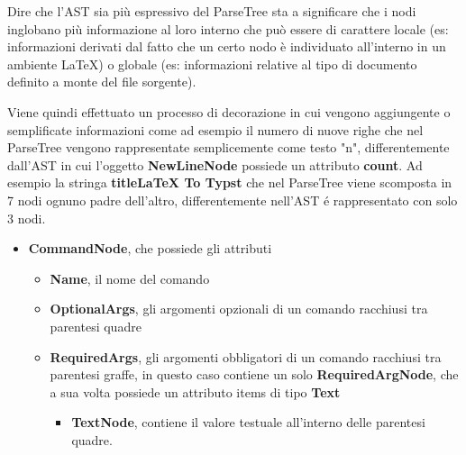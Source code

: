 \documentclass{article}
\begin{document}
    Dire che l'AST sia più espressivo del ParseTree sta a significare che i nodi inglobano più informazione al loro interno che può essere di carattere locale (es: informazioni derivati dal fatto che un certo nodo è individuato all'interno in un ambiente LaTeX) o globale (es: informazioni relative al tipo di documento definito a monte del file sorgente).

    Viene quindi effettuato un processo di decorazione in cui vengono aggiungente o semplificate informazioni come ad esempio il numero di nuove righe che nel ParseTree vengono rappresentate semplicemente come testo "n", differentemente dall'AST in cui l'oggetto \textbf{NewLineNode} possiede un attributo \textbf{count}. Ad esempio la stringa \textbf{title{LaTeX To Typst}} che nel ParseTree viene scomposta in 7 nodi ognuno padre dell'altro, differentemente nell'AST é rappresentato con solo 3 nodi.

    \begin{itemize}
        \item \textbf{CommandNode}, che possiede gli attributi \begin{itemize}
                                                                   \item \textbf{Name}, il nome del comando
                                                                   \item \textbf{OptionalArgs}, gli argomenti opzionali di un comando racchiusi tra parentesi quadre
                                                                   \item \textbf{RequiredArgs}, gli argomenti obbligatori di un comando racchiusi tra parentesi graffe, in questo caso contiene un solo \textbf{RequiredArgNode}, che a sua volta possiede un attributo items di tipo \textbf{Text} \begin{itemize}
                                                                                                                                                                                                                                                                                                        \item \textbf{TextNode}, contiene il valore testuale all'interno delle parentesi quadre.
                                                                   \end{itemize}
        \end{itemize}
    \end{itemize}
\end{document}
